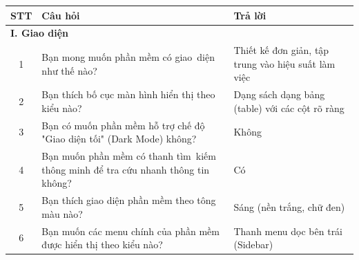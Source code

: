 \documentclass[a4paper,12pt]{report}
\begin{document}
\begin{longtable}{|c|p{8cm}|p{7cm}|}
    \hline
    \textbf{STT} & \textbf{Câu hỏi}                                                                                                        & \textbf{Trả lời}                                                                                                         \\
    \hline
    \multicolumn{3}{|l|}{\textbf{I. Giao diện}}                                                                                                                                                                                                                       \\
    \hline
    1            & Bạn mong muốn phần mềm có giao~diện như thế nào?                                                                        & Thiết kế đơn giản, tập trung vào hiệu suất làm việc                                                                      \\
    \hline
    2            & Bạn thích bố cục màn hình hiển thị theo kiểu nào?                                                                       & Dạng sách dạng bảng (table) với các cột rõ ràng                                                                          \\
    \hline
    3            & Bạn có muốn phần mềm hỗ trợ chế độ "Giao diện tối" (Dark Mode) không?                                                   & Không                                                                                                                    \\
    \hline
    4            & Bạn muốn phần mềm có thanh tìm~kiếm thông minh để tra cứu nhanh thông tin không?                                        & Có                                                                                                                       \\
    \hline
    5            & Bạn thích giao diện phần mềm theo tông màu nào?                                                                         & Sáng (nền trắng, chữ đen)                                                                                                \\
    \hline
    6            & Bạn muốn các menu chính của phần mềm được hiển thị theo kiểu nào?                                                       & Thanh menu dọc bên trái (Sidebar)                                                                                        \\

\end{longtable}
\end{document}
